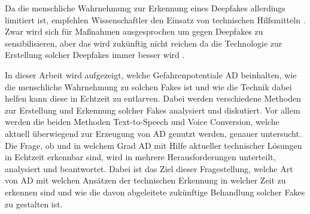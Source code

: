 Da die menschliche Wahrnehmung zur Erkennung eines Deepfakes allerdings limitiert ist, empfehlen Wissenschaftler den Einsatz von technischen Hilfsmitteln \citep[][]{Mueller2022}.
Zwar wird sich für Maßnahmen ausgesprochen um gegen Deepfakes zu sensibilisieren, aber das wird zukünftig nicht reichen da die Technologie zur Erstellung solcher Deepfakes immer besser wird \citep[][]{Amezaga2022}.
\par
In dieser Arbeit wird aufgezeigt, welche Gefahrenpotentiale AD beinhalten, wie die menschliche Wahrnehmung zu solchen Fakes ist und wie die Technik dabei helfen kann diese in Echtzeit zu entlarven.
Dabei werden verschiedene Methoden zur Erstellung und Erkennung solcher Fakes analysiert und diskutiert.
Vor allem werden die beiden Methoden Text-to-Speech und Voice Conversion, welche aktuell überwiegend zur Erzeugung von AD genutzt werden, genauer untersucht.
Die Frage, ob und in welchem Grad AD mit Hilfe aktueller technischer Lösungen in Echtzeit erkennbar sind, wird in mehrere Herausforderungen unterteilt, analysiert und beantwortet.
Dabei ist das Ziel dieser Fragestellung, welche Art von AD mit welchen Ansätzen der technischen Erkennung in welcher Zeit zu erkennen sind und wie die davon abgeleitete zukünftige Behandlung solcher Fakes zu gestalten ist. 
